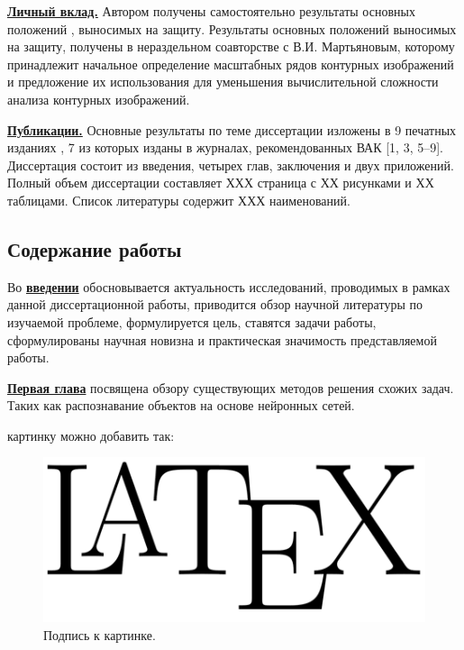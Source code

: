 \noindent
\underline{\textbf{Личный вклад.}} Автором получены самостоятельно результаты основных положений \cite{A1,A2,A3,A4,A5,A6,A7,A8,A9},  выносимых  на защиту.  Результаты основных положений \cite{A3,A4,A5}  выносимых  на защиту, получены в нераздельном соавторстве с В.И. Мартьяновым, которому принадлежит начальное определение масштабных рядов контурных изображений и предложение их использования для уменьшения вычислительной сложности анализа контурных изображений.

\noindent
\underline{\textbf{Публикации.}} Основные результаты по теме диссертации изложены в 9 печатных изданиях \cite{A1,A2,A3,A4,A5,A6,A7,A8,A9}, 7 из которых изданы в журналах, рекомендованных ВАК \cite{A1,A2,A3,A4,A5,A6,A7,A8,A9}[1, 3, 5–9]. Диссертация состоит из введения, четырех глав, заключения и двух приложений. Полный объем диссертации составляет ХХХ страница с ХХ рисунками и ХХ таблицами. Список литературы содержит ХХХ наименований.


\subsection*{\Large Содержание работы}
Во \underline{\textbf{введении}} обосновывается актуальность исследований, проводимых в рамках данной диссертационной работы, приводится обзор научной литературы по изучаемой проблеме, формулируется цель, ставятся задачи работы, сформулированы научная новизна и практическая значимость представляемой работы.

\underline{\textbf{Первая глава}} посвящена обзору существующих методов решения схожих задач. Таких как распознавание объектов на основе нейронных сетей. 

 картинку можно добавить так:
\begin{figure}[h] 
  \center
  \includegraphics [scale=0.27] {latex}
  \caption{Подпись к картинке.} 
  \label{img:latex}
\end{figure}

